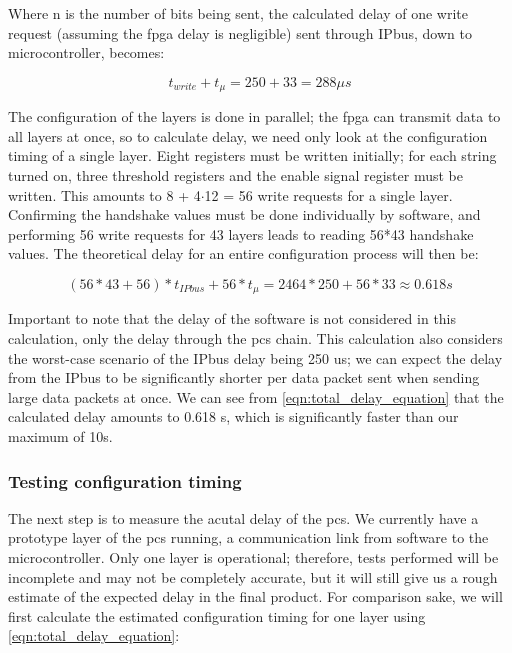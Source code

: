 \documentclass[main.tex]{subfiles}
\begin{document}
Where n is the number of bits being sent, the calculated delay of one write request (assuming the \gls{fpga} delay is negligible) sent through IPbus, down to microcontroller, becomes:

\begin{equation} \label{eqn:write_delay_equation}
t_{write}+t_{\mu }= 250 + 33 = 288\mu s
\end{equation}

The configuration of the layers is done in parallel; the \gls{fpga} can transmit data to all layers at once, so to calculate delay, we need only look at the configuration timing of a single layer. Eight registers must be written initially; for each string turned on, three threshold registers and the enable signal register must be written. This amounts to 8 + 4$\cdot$12 = 56 write requests for a single layer. Confirming the handshake values must be done individually by software, and performing 56 write requests for 43 layers leads to reading 56*43 handshake values. The theoretical delay for an entire configuration process will then be:

\begin{equation} \label{eqn:total_delay_equation}
(56*43+56)*t_{IPbus}+56*t_{\mu }= 2464 * 250 + 56*33 \approx 0.618 s
\end{equation}

Important to note that the delay of the software is not considered in this calculation, only the delay through the \gls{pcs} chain. This calculation also considers the worst-case scenario of the IPbus delay being 250 us; we can expect the delay from the IPbus to be significantly shorter per data packet sent when sending large data packets at once. We can see from \autoref{eqn:total_delay_equation} that the calculated delay amounts to 0.618 s, which is significantly faster than our maximum of 10s.

\subsubsection{Testing configuration timing}

The next step is to measure the acutal delay of the \gls{pcs}. We currently have a prototype layer of the \gls{pcs} running, a communication link from software to the microcontroller. Only one layer is operational; therefore, tests performed will be incomplete and may not be completely accurate, but it will still give us a rough estimate of the expected delay in the final product. For comparison sake, we will first calculate the estimated configuration timing for one layer using \autoref{eqn:total_delay_equation}:
\end{document}
